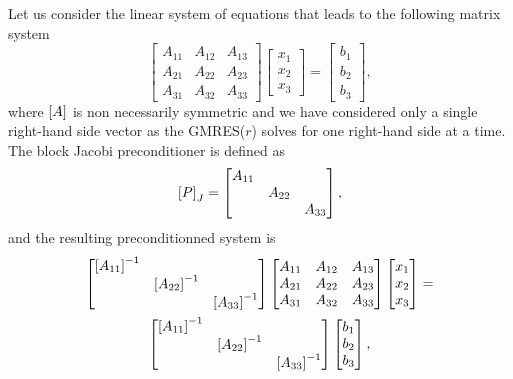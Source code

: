 Let us consider the linear system of equations that leads to the following matrix system 
\begin{equation}
\label{eq:SysBlocks}
\begin{bmatrix}
A_{11} & A_{12} & A_{13}\\
A_{21} & A_{22} & A_{23}\\
A_{31} & A_{32} & A_{33}
\end{bmatrix}
\begin{bmatrix}
x_{1}\\
x_{2}\\
x_{3}
\end{bmatrix}
=
\begin{bmatrix}
b_{1}\\
b_{2}\\
b_{3}
\end{bmatrix},
\end{equation}
\noindent where $\left[A\right]$ is non necessarily symmetric and we have considered only a single right-hand side vector as the GMRES($r$) solves for one right-hand side at a time. The block Jacobi preconditioner is defined as
\begin{equation}
\label{eq:jc}
\left[P\right]_{J}
=
\begin{bmatrix}
A_{11} &  & \\
 & A_{22} & \\
 & & A_{33}
\end{bmatrix},
\end{equation}
\noindent and the resulting preconditionned system is
\begin{multline}
\begin{bmatrix}
\left[A_{11}\right]^{-1} &  & \\
 & \left[A_{22}\right]^{-1} & \\
 & & \left[A_{33}\right]^{-1}
\end{bmatrix}
\begin{bmatrix}
A_{11} & A_{12} & A_{13}\\
A_{21} & A_{22} & A_{23}\\
A_{31} & A_{32} & A_{33}
\end{bmatrix}
\begin{bmatrix}
x_{1}\\
x_{2}\\
x_{3}
\end{bmatrix}
=\\
\begin{bmatrix}
\left[A_{11}\right]^{-1} &  & \\
 & \left[A_{22}\right]^{-1} & \\
 & & \left[A_{33}\right]^{-1}
\end{bmatrix}
\begin{bmatrix}
b_{1}\\
b_{2}\\
b_{3}
\end{bmatrix},
\end{multline}
